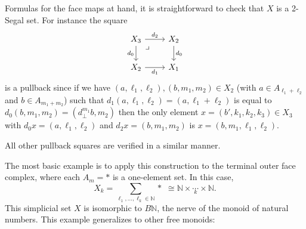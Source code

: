 \documentclass{amsart}
\theoremstyle{definition}
\theoremstyle{remark}
\begin{document}
Formulas for the face maps at hand, it is straightforward to check that $X$ is a 2-Segal set.
For instance the square 
\[ \begin{tikzcd}
X_3 \ar[dr, phantom, "\lrcorner" very near start] \rar{d_2} \dar[swap]{d_0} & X_2 \dar{d_0} \\
X_2 \rar[swap]{d_1} & X_1
\end{tikzcd} \]
is a pullback
since if we have $(a,\ell_1, \ell_2), (b,m_1,m_2) \in X_2$ (with $a\in A_{\ell_1 + \ell_2}$ and $b\in A_{m_1 + m_2}$) such that $d_1(a, \ell_1, \ell_2) = (a, \ell_1 + \ell_2)$ is equal to $d_0(b,m_1, m_2) = (d_\bot^{m_1} b, m_2)$ then the only element $x = (b',k_1, k_2, k_3) \in X_3$ with $d_0 x = (a,\ell_1,\ell_2)$ and $d_2x = (b,m_1,m_2)$ is $x = (b,m_1, \ell_1, \ell_2)$. 

All other pullback squares are verified in a similar manner.

The most basic example is to apply this construction to the terminal outer face complex, where each $A_m = \ast$ is a one-element set.
In this case, \[ X_k = \sum_{\ell_1, \dots, \ell_k \in \mathbb{N}} \ast \,\, \cong \mathbb{N} \times \underset{k}\cdots \times \mathbb{N}.\]
This simplicial set $X$ is isomorphic to $B\mathbb{N}$, the nerve of the monoid of natural numbers.
This example generalizes to other free monoids:
\end{document}
